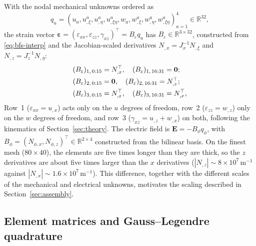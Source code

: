 \documentclass[pdflatex,sn-mathphys-num]{sn-jnl}
\begin{document}
With the nodal mechanical unknowns ordered as
\[
q_u=(u_a,u_{,\xi}^a,u_{,\eta}^a,u_{,\xi\eta}^a,
w_a,w_{,\xi}^a,w_{,\eta}^a,w_{,\xi\eta}^a)_{a=1}^{4}\in\mathbb{R}^{32},
\]
the strain vector
$\bm\varepsilon=(\varepsilon_{xx},\varepsilon_{zz},\gamma_{xz})^\top
=B_\varepsilon q_u$ has $B_\varepsilon\in\mathbb{R}^{3\times32}$, constructed from
\eqref{eq:bfs-interp} and the Jacobian-scaled derivatives
$N_{,x}=J_x^{-1}N_{,\xi}$ and $N_{,z}=J_z^{-1}N_{,\eta}$:
\begin{align}
(B_\varepsilon)_{1,\,0:15}&=N_{,x}^\top,\quad
(B_\varepsilon)_{1,\,16:31}=\bm0;\notag\\
(B_\varepsilon)_{2,\,0:15}&=\bm0,\quad
(B_\varepsilon)_{2,\,16:31}=N_{,z}^\top;\notag\\
(B_\varepsilon)_{3,\,0:15}&=N_{,z}^\top,\quad
(B_\varepsilon)_{3,\,16:31}=N_{,x}^\top,
\label{eq:Beps}
\end{align}
Row~1 ($\varepsilon_{xx}=u_{,x}$) acts only on the $u$ degrees of freedom,
row~2 ($\varepsilon_{zz}=w_{,z}$) only on the $w$ degrees of freedom, and row~3
($\gamma_{xz}=u_{,z}+w_{,x}$) on both, following the kinematics of
Section~\ref{sec:theory}. The electric field is
$\bm E=-B_\phi q_\phi$, with
$B_\phi=(N_{\phi,x},N_{\phi,z})^\top\in\mathbb{R}^{2\times4}$ constructed from the
bilinear basis. On the finest mesh ($80\times40$), the elements are five times longer
than they are thick, so the $z$ derivatives are about five times larger than the
$x$ derivatives ($|N_{,z}|\sim8\times10^{7}\,\text{m}^{-1}$ against
$|N_{,x}|\sim1.6\times10^{7}\,\text{m}^{-1}$). This difference, together with the
different scales of the mechanical and electrical unknowns, motivates the scaling
described in Section~\ref{sec:assembly}.

\subsection{Element matrices and Gauss--Legendre quadrature}
\end{document}

